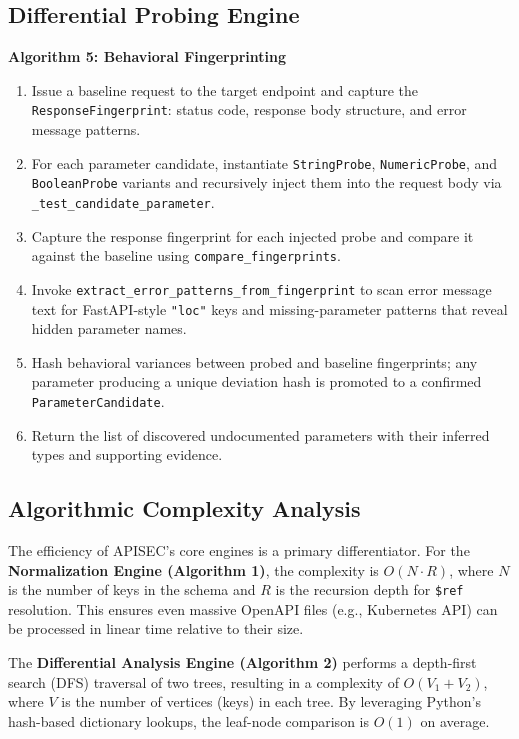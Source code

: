 \documentclass{fisatprojectfinal}
\begin{document}
\subsection{Differential Probing Engine}
\textbf{Algorithm 5: Behavioral Fingerprinting}
\begin{enumerate}[label=\textbf{Step \arabic*:}]
    \item Issue a baseline request to the target endpoint and capture the \texttt{ResponseFingerprint}: status code, response body structure, and error message patterns.
    \item For each parameter candidate, instantiate \texttt{StringProbe}, \texttt{NumericProbe}, and \texttt{BooleanProbe} variants and recursively inject them into the request body via \texttt{\_test\_candidate\_parameter}.
    \item Capture the response fingerprint for each injected probe and compare it against the baseline using \texttt{compare\_fingerprints}.
    \item Invoke \texttt{extract\_error\_patterns\_from\_fingerprint} to scan error message text for FastAPI-style \texttt{"loc"} keys and missing-parameter patterns that reveal hidden parameter names.
    \item Hash behavioral variances between probed and baseline fingerprints; any parameter producing a unique deviation hash is promoted to a confirmed \texttt{ParameterCandidate}.
    \item Return the list of discovered undocumented parameters with their inferred types and supporting evidence.
\end{enumerate}

\subsection{Algorithmic Complexity Analysis}
The efficiency of APISEC's core engines is a primary differentiator. For the \textbf{Normalization Engine (Algorithm 1)}, the complexity is $O(N \cdot R)$, where $N$ is the number of keys in the schema and $R$ is the recursion depth for \texttt{\$ref} resolution. This ensures even massive OpenAPI files (e.g., Kubernetes API) can be processed in linear time relative to their size.

The \textbf{Differential Analysis Engine (Algorithm 2)} performs a depth-first search (DFS) traversal of two trees, resulting in a complexity of $O(V_1 + V_2)$, where $V$ is the number of vertices (keys) in each tree. By leveraging Python's hash-based dictionary lookups, the leaf-node comparison is $O(1)$ on average.
\end{document}
